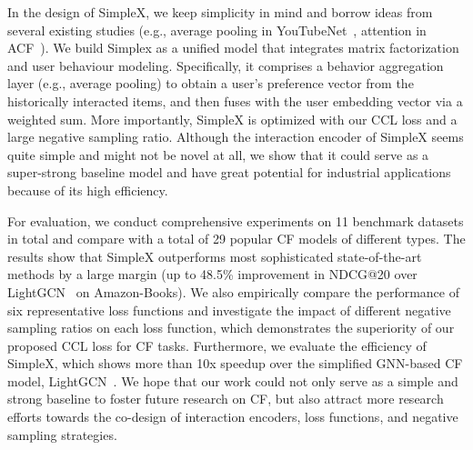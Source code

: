 \documentclass[sigconf,authorversion]{acmart}
\begin{document}
In the design of SimpleX, we keep simplicity in mind and borrow ideas from several existing studies (e.g., average pooling in YouTubeNet~\cite{YouTubeNet}, attention in ACF~\cite{ACF}). We build Simplex as a unified model that integrates matrix factorization and user behaviour modeling. Specifically, it comprises a behavior aggregation layer (e.g., average pooling) to obtain a user's preference vector from the historically interacted items, and then fuses with the user embedding vector via a weighted sum. More importantly, SimpleX is optimized with our CCL loss and a large negative sampling ratio. Although the interaction encoder of SimpleX seems quite simple and might not be novel at all, we show that it could serve as a super-strong baseline model and have great potential for industrial applications because of its high efficiency.

































For evaluation, we conduct comprehensive experiments on 11 benchmark datasets in total and compare with a total of 29 popular CF models of different types. The results show that SimpleX outperforms most sophisticated state-of-the-art methods by a large margin (up to 48.5\% improvement in NDCG@20 over LightGCN~\cite{LightGCN} on Amazon-Books). We also empirically compare the performance of six representative loss functions and investigate the impact of different negative sampling ratios on each loss function, which demonstrates the superiority of our proposed CCL loss for CF tasks. Furthermore, we evaluate the efficiency of SimpleX, which shows more than 10x speedup over the simplified GNN-based CF model, LightGCN~\cite{LightGCN}. We hope that our work could not only serve as a simple and strong baseline to foster future research on CF, but also attract more research efforts towards the co-design of interaction encoders, loss functions, and negative sampling strategies.
\end{document}
